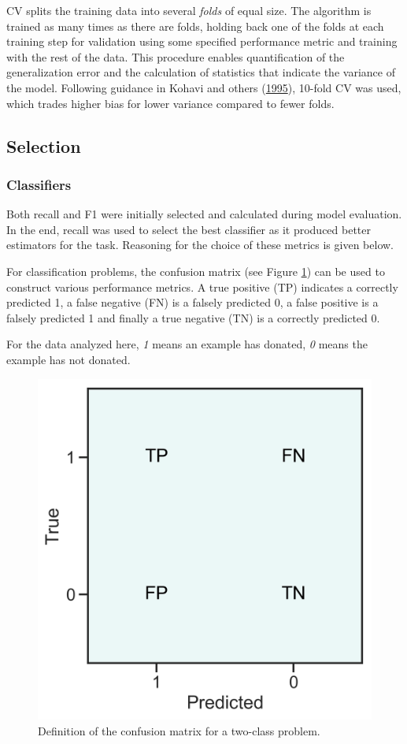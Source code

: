 \documentclass[
  11pt,
  a4paper,
  DIV=12,captions=tableheading,oneside,titlepage]{scrbook}
\begin{document}
CV splits the training data into several \emph{folds} of equal size. The algorithm is trained as many times as there are folds, holding back one of the folds at each training step for validation using some specified performance metric and training with the rest of the data. This procedure enables quantification of the generalization error and the calculation of statistics that indicate the variance of the model. Following guidance in Kohavi and others (\protect\hyperlink{ref-kohavi1995study}{1995}), 10-fold CV was used, which trades higher bias for lower variance compared to fewer folds.

\hypertarget{selection}{%
\subsection{Selection}\label{selection}}

\hypertarget{classifiers}{%
\subsubsection{Classifiers}\label{classifiers}}

Both recall and F1 were initially selected and calculated during model evaluation. In the end, recall was used to select the best classifier as it produced better estimators for the task. Reasoning for the choice of these metrics is given below.

For classification problems, the confusion matrix (see Figure \ref{fig:conf-mat-plot}) can be used to construct various performance metrics. A true positive (TP) indicates a correctly predicted 1, a false negative (FN) is a falsely predicted 0, a false positive is a falsely predicted 1 and finally a true negative (TN) is a correctly predicted 0.

For the data analyzed here, \emph{1} means an example has donated, \emph{0} means the example has not donated.



\begin{figure}

{\centering \includegraphics[width=0.3\linewidth]{figures/methods/conf-mat} 

}

\caption{Definition of the confusion matrix for a two-class problem.}\label{fig:conf-mat-plot}
\end{figure}
\end{document}
